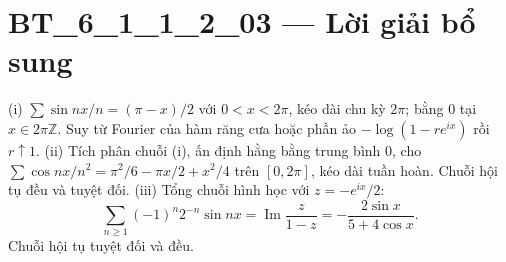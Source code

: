 \documentclass[10pt,a4paper]{article}
\begin{document}
\section*{BT\_6\_1\_1\_2\_03 — Lời giải bổ sung}
(i) $\sum\sin nx/n=(\pi-x)/2$ với $0<x<2\pi$, kéo dài chu kỳ $2\pi$; bằng 0 tại $x\in2\pi\mathbb Z$. Suy từ Fourier của hàm răng cưa hoặc phần ảo $-\log(1-re^{ix})$ rồi $r\uparrow1$.
(ii) Tích phân chuỗi (i), ấn định hằng bằng trung bình 0, cho $\sum\cos nx/n^2=\pi^2/6-\pi x/2+x^2/4$ trên $[0,2\pi]$, kéo dài tuần hoàn. Chuỗi hội tụ đều và tuyệt đối.
(iii) Tổng chuỗi hình học với $z=-e^{ix}/2$:
\[\sum_{n\ge1}(-1)^n2^{-n}\sin nx=\operatorname{Im}\frac z{1-z}=-\frac{2\sin x}{5+4\cos x}.\]
Chuỗi hội tụ tuyệt đối và đều.
\end{document}
